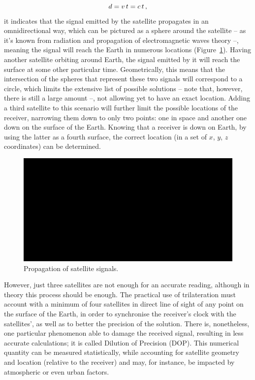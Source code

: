 \begin{equation}\label{eq:2_1}
    d = v\,t = c\,t\,,\medskip
\end{equation}
it indicates that the signal emitted by the satellite propagates in an omnidirectional way, which can be pictured as a sphere around the satellite -- as it's known from radiation and propagation of electromagnetic waves theory --, meaning the signal will reach the Earth in numerous locations (Figure~\ref{fig:omnidirectional}).
Having another satellite orbiting around Earth, the signal emitted by it will reach the surface at some other particular time. Geometrically, this means that the intersection of the spheres that represent these two signals will correspond to a circle, which limits the extensive list of possible solutions -- note that, however, there is still a large amount --, not allowing yet to have an exact location. Adding a third satellite to this scenario will further limit the possible locations of the receiver, narrowing them down to only two points: one in space and another one down on the surface of the Earth. Knowing that a receiver is down on Earth, by using the latter as a fourth surface, the correct location (in a set of $x$, $y$, $z$ coordinates) can be determined.
\begin{figure}[ht]
	\centering
	\includegraphics[width=1.0\textwidth]{Chapters/Figures/demo.png}
	\caption{Propagation of satellite signals.}
	\label{fig:omnidirectional}
\end{figure}
However, just three satellites are not enough for an accurate reading, although in theory this process should be enough. The practical use of trilateration must account with a minimum of four satellites in direct line of sight of any point on the surface of the Earth, in order to synchronise the receiver's clock with the satellites', as well as to better the precision of the solution.
There is, nonetheless, one particular phenomenon able to damage the received signal, resulting in less accurate calculations; it is called Dilution of Precision (DOP). This numerical quantity can be measured statistically, while accounting for satellite geometry and location (relative to the receiver) and may, for instance, be impacted by atmospheric or even urban factors.
